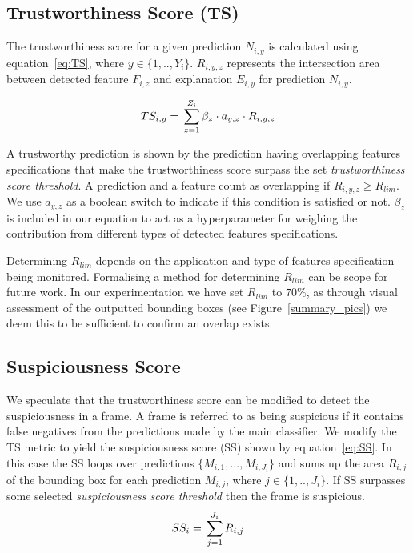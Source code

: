 \subsection{Trustworthiness Score (TS)}\label{TS_section}
The trustworthiness score for a given prediction $N_{i,y}$ is calculated using equation~\ref{eq:TS}, where $y\in\{1,..,Y_i\}$. 
%
$R_{i,y,z}$ represents the intersection area between detected feature $F_{i,z}$ and explanation $E_{i,y}$ for prediction $N_{i,y}$. 

\begin{equation}
\label{eq:TS}
    TS_{i,y} = \sideset{}{}\sum_{z=1}^{Z_i} \beta_z \cdot a_{y,z} \cdot R_{i,y,z}%
\end{equation}



A trustworthy prediction is shown by the prediction having overlapping features specifications that make the trustworthiness score surpass the set \textit{trustworthiness score threshold}. 
%
A prediction and a feature count as overlapping if $R_{i,y,z} \geq R_{lim}$. We use $a_{y,z}$ as a boolean switch to indicate if this condition is satisfied or not. $\beta_z$ is included in our equation to act as a hyperparameter for weighing the contribution from different types of detected features specifications.

Determining $R_{lim}$ depends on the application and type of features specification being monitored. Formalising a method for determining $R_{lim}$ can be scope for future work. In our experimentation we have set $R_{lim}$ to $70\%$, as through visual assessment of the outputted bounding boxes (see Figure~\ref{summary_pics}) we deem this to be sufficient to confirm an overlap exists.    

\subsection{Suspiciousness Score}
We speculate that the trustworthiness score can be modified to detect the suspiciousness in a frame. A frame is referred to as being suspicious if it contains false negatives from the predictions made by the main classifier. 
%
%
We modify the TS metric to yield the suspiciousness score (SS) shown by equation~\ref{eq:SS}. 
%
In this case the SS loops over predictions $\{M_{i,1},..., M_{i,J_i}\}$ and sums up the area $R_{i,j}$ of the bounding box for each prediction $M_{i,j}$, where $j\in\{1,..,J_i\}$. 
%
If SS surpasses some selected \textit{suspiciousness score threshold} then the frame is suspicious. 
\begin{equation}
    SS_i = \sideset{}{}\sum_{j=1}^{J_i} R_{i,j}
    \label{eq:SS}
\end{equation}




